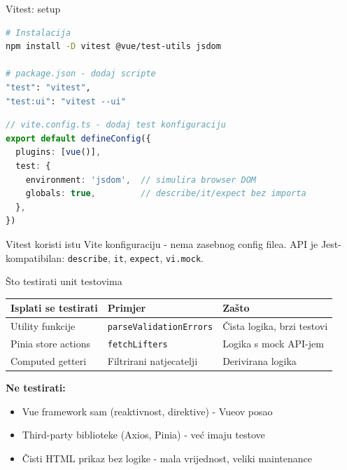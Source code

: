 \begin{frame}[fragile,shrink=5]{Vitest: setup}
\begin{lstlisting}[language=bash]
# Instalacija
npm install -D vitest @vue/test-utils jsdom

# package.json - dodaj scripte
"test": "vitest",
"test:ui": "vitest --ui"
\end{lstlisting}

\begin{lstlisting}[language=typescript]
// vite.config.ts - dodaj test konfiguraciju
export default defineConfig({
  plugins: [vue()],
  test: {
    environment: 'jsdom',  // simulira browser DOM
    globals: true,         // describe/it/expect bez importa
  },
})
\end{lstlisting}

\vspace{0.4em}
Vitest koristi istu Vite konfiguraciju - nema zasebnog config filea. API je Jest-kompatibilan: \texttt{describe}, \texttt{it}, \texttt{expect}, \texttt{vi.mock}.
\end{frame}

\begin{frame}{Što testirati unit testovima}
\begin{tabular}{@{}lp{5cm}p{4.5cm}@{}}
  \toprule
  \textbf{Isplati se testirati} & \textbf{Primjer} & \textbf{Zašto} \\
  \midrule
  Utility funkcije & \texttt{parseValidationErrors} & Čista logika, brzi testovi \\
  Pinia store actions & \texttt{fetchLifters} & Logika s mock API-jem \\
  Computed getteri & Filtrirani natjecatelji & Derivirana logika \\
  \bottomrule
\end{tabular}

\vspace{0.6em}
\textbf{Ne testirati:}
\begin{itemize}
  \item Vue framework sam (reaktivnost, direktive) - Vueov posao
  \item Third-party biblioteke (Axios, Pinia) - već imaju testove
  \item Čisti HTML prikaz bez logike - mala vrijednost, veliki maintenance
\end{itemize}
\end{frame}

